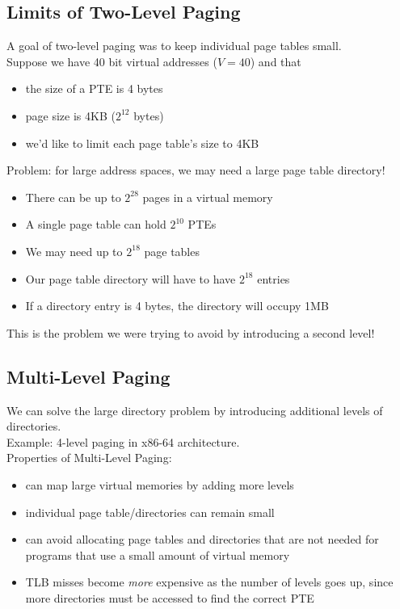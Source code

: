 \documentclass[12pt]{article}
\theoremstyle{plain}
\theoremstyle{definition}
\begin{document}
\subsection{Limits of Two-Level Paging}
A goal of two-level paging was to keep individual page tables small. \\
Suppose we have 40 bit virtual addresses ($V = 40$) and that
\begin{itemize}
  \item the size of a PTE is 4 bytes
  \item page size is 4KB ($2^{12}$ bytes)
  \item we'd like to limit each page table's size to 4KB
\end{itemize}
Problem: for large address spaces, we may need a large page table directory!
\begin{itemize}
  \item There can be up to $2^{28}$ pages in a virtual memory
  \item A single page table can hold $2^{10}$ PTEs
  \item We may need up to $2^{18}$ page tables
  \item Our page table directory will have to have $2^{18}$ entries
  \item If a directory entry is 4 bytes, the directory will occupy 1MB
\end{itemize}
This is the problem we were trying to avoid by introducing a second level!

\subsection{Multi-Level Paging}
We can solve the large directory problem by introducing additional levels of directories. \\
Example: 4-level paging in x86-64 architecture. \\
Properties of Multi-Level Paging:
\begin{itemize}
  \item can map large virtual memories by adding more levels
  \item individual page table/directories can remain small
  \item can avoid allocating page tables and directories that are not needed for programs that use a small amount of virtual memory
  \item TLB misses become \emph{more} expensive as the number of levels goes up, since more directories must be accessed to find the correct PTE
\end{itemize}
\end{document}
